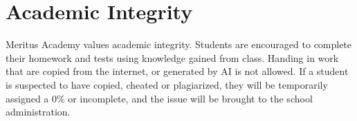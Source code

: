 \documentclass{../../../oss-handout}
\begin{document}




\section{Academic Integrity}
Meritus Academy values academic integrity. Students are encouraged to complete
their homework and tests using knowledge gained from class. Handing in work
that are copied from the internet, or generated by AI is not allowed. If a
student is suspected to have copied, cheated or plagiarized, they will be
temporarily assigned a 0\% or incomplete, and the issue will be brought to the
school administration.
\end{document}
